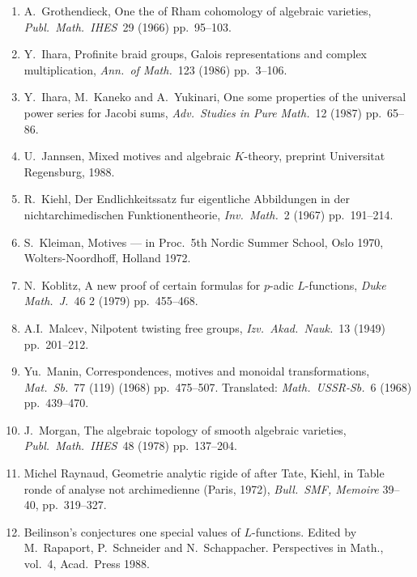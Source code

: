 \documentclass[12pt,a4paper]{article}
\theoremstyle{plain}
\theoremstyle{definition}
\theoremstyle{remark}
\begin{document}
\begin{enumerate}
\item[{[G]}] A.\ Grothendieck, One the of Rham cohomology of algebraic
varieties, \textit{Publ.\ Math.\ IHES}\ 29 (1966) pp.\ 95--103.

\item[{[I]}] Y.\ Ihara, Profinite braid groups, Galois representations
and complex multiplication, \textit{Ann.\ of Math.}\ 123 (1986) pp.\ 3--106.

\item[{[IKY]}] Y.\ Ihara, M.\ Kaneko and A.\ Yukinari, One some
properties of the universal power series for Jacobi sums,
\textit{Adv.\ Studies in Pure Math.}\ 12 (1987) pp.\ 65--86.

\item[{[J]}] U.\ Jannsen, Mixed motives and algebraic $K$-theory,
preprint Universitat Regensburg, 1988.

\item[{[Ki]}] R.\ Kiehl, Der Endlichkeitssatz fur eigentliche
Abbildungen in der nichtarchimedischen Funktionentheorie,
\textit{Inv.\ Math.}\ 2 (1967) pp.\ 191--214.

\item[{[Kl]}] S.\ Kleiman, Motives --- in Proc.\ 5th Nordic Summer
School, Oslo 1970, Wolters-Noordhoff, Holland 1972.

\item[{[Ko]}] N.\ Koblitz, A new proof of certain formulas for $p$-adic
$L$-functions, \textit{Duke Math.\ J.}\ 46 2 (1979) pp.\ 455--468.

\item[{[Ma1]}] A.I.\ Malcev, Nilpotent twisting free groups,
\textit{Izv.\ Akad.\ Nauk.}\ 13 (1949) pp.\ 201--212.

\item[{[Man]}] Yu.\ Manin, Correspondences, motives and monoidal
transformations, \textit{Mat.\ Sb.}\ 77 (119) (1968) pp.\ 475--507.
Translated: \textit{Math.\ USSR-Sb.}\ 6 (1968) pp.\ 439--470.

\item[{[Mo]}] J.\ Morgan, The algebraic topology of smooth algebraic
varieties, \textit{Publ.\ Math.\ IHES}\ 48 (1978) pp.\ 137--204.

\item[{[R]}] Michel Raynaud, Geometrie analytic rigide of after Tate,
Kiehl, in Table ronde of analyse not archimedienne (Paris, 1972),
\textit{Bull.\ SMF, Memoire} 39--40, pp.\ 319--327.

\item[{[RSS]}] Beilinson's conjectures one special values of
$L$-functions. Edited by M.\ Rapaport, P.\ Schneider and N.\ Schappacher.
Perspectives in Math., vol.\ 4, Acad.\ Press 1988.


\end{enumerate}
\end{document}
